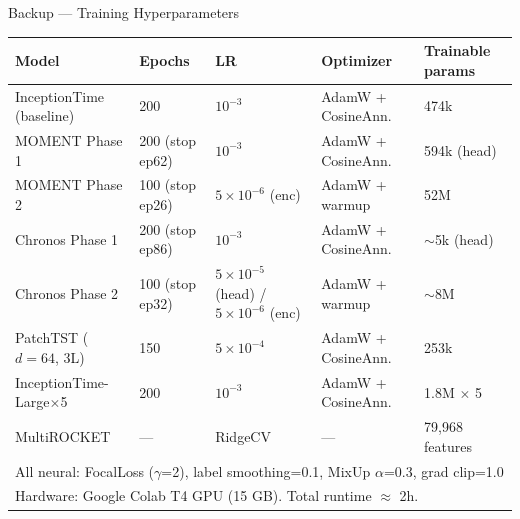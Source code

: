 \documentclass[aspectratio=169, 10pt]{beamer}
\begin{document}
\begin{frame}[noframenumbering]{Backup — Training Hyperparameters}
  \begin{center}
  \footnotesize
  \begin{tabular}{lllll}
    \toprule
    Model & Epochs & LR & Optimizer & Trainable params \\
    \midrule
    InceptionTime (baseline)    & 200 & $10^{-3}$        & AdamW + CosineAnn. & 474k \\
    MOMENT Phase 1              & 200 (stop ep62) & $10^{-3}$        & AdamW + CosineAnn. & 594k (head) \\
    MOMENT Phase 2              & 100 (stop ep26) & $5\times10^{-6}$ (enc) & AdamW + warmup & 52M \\
    Chronos Phase 1             & 200 (stop ep86) & $10^{-3}$        & AdamW + CosineAnn. & $\sim$5k (head) \\
    Chronos Phase 2             & 100 (stop ep32) & $5\times10^{-5}$ (head) / $5\times10^{-6}$ (enc) & AdamW + warmup & $\sim$8M \\
    PatchTST ($d=64$, 3L)       & 150 & $5\times10^{-4}$ & AdamW + CosineAnn. & 253k \\
    InceptionTime-Large$\times$5 & 200 & $10^{-3}$       & AdamW + CosineAnn. & 1.8M $\times$ 5 \\
    MultiROCKET                 & —   & RidgeCV          & —                  & 79,968 features \\
    \midrule
    \multicolumn{5}{l}{All neural: FocalLoss ($\gamma$=2), label smoothing=0.1, MixUp $\alpha$=0.3, grad clip=1.0} \\
    \multicolumn{5}{l}{Hardware: Google Colab T4 GPU (15 GB). Total runtime $\approx$ 2h.} \\
    \bottomrule
  \end{tabular}
  \end{center}
\end{frame}
\end{document}
